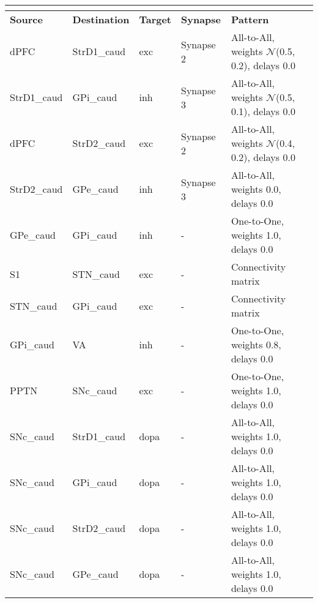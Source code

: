 \documentclass{article}
\newcommand{\hdr}[3]{
    \multicolumn{#1}{|l|}{
        \color{white}\cellcolor[gray]{0.0}
        \textbf{\makebox[0pt]{#2}\hspace{0.5\linewidth}\makebox[0pt][c]{#3}}
    }
}
\begin{document}
\noindent
\begin{tabularx}{\linewidth}{|l|l|l|X|X|}\hline
\hdr{5}{C}{Connectivity}\\ \hline
\textbf{Source} & \textbf{Destination} & \textbf{Target} & \textbf{Synapse} & \textbf{Pattern} \\ \hline

    dPFC & StrD1\_caud & exc & Synapse 2 &
    All-to-All, weights $\mathcal{N}$(0.5, 0.2), delays 0.0 \\ \hline

    StrD1\_caud & GPi\_caud & inh & Synapse 3 &
    All-to-All, weights $\mathcal{N}$(0.5, 0.1), delays 0.0 \\ \hline

    dPFC & StrD2\_caud & exc & Synapse 2 &
    All-to-All, weights $\mathcal{N}$(0.4, 0.2), delays 0.0 \\ \hline

    StrD2\_caud & GPe\_caud & inh & Synapse 3 &
    All-to-All, weights 0.0, delays 0.0 \\ \hline

    GPe\_caud & GPi\_caud & inh & - &
    One-to-One, weights 1.0, delays 0.0 \\ \hline

    S1 & STN\_caud & exc & - &
    Connectivity matrix \\ \hline

    STN\_caud & GPi\_caud & exc & - &
    Connectivity matrix \\ \hline

    GPi\_caud & VA & inh & - &
    One-to-One, weights 0.8, delays 0.0 \\ \hline

    PPTN & SNc\_caud & exc & - &
    One-to-One, weights 1.0, delays 0.0 \\ \hline

    SNc\_caud & StrD1\_caud & dopa & - &
    All-to-All, weights 1.0, delays 0.0 \\ \hline

    SNc\_caud & GPi\_caud & dopa & - &
    All-to-All, weights 1.0, delays 0.0 \\ \hline

    SNc\_caud & StrD2\_caud & dopa & - &
    All-to-All, weights 1.0, delays 0.0 \\ \hline

    SNc\_caud & GPe\_caud & dopa & - &
    All-to-All, weights 1.0, delays 0.0 \\ \hline


\end{tabularx}
\end{document}
